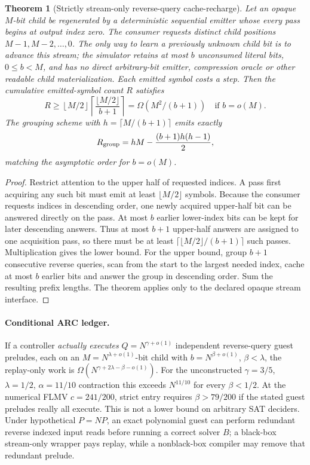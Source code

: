 \documentclass[10pt]{article}
\newtheorem{theorem}{Theorem}
\begin{document}
\begin{theorem}[Strictly stream-only reverse-query cache-recharge]
Let an opaque $M$-bit child be regenerated by a deterministic sequential
emitter whose every pass begins at output index zero.
The consumer requests distinct child positions $M-1,M-2,\ldots,0$.
The only way to learn a previously unknown child bit is to advance this
stream; the simulator retains at most $b$ unconsumed literal bits,
$0\le b<M$, and has no direct arbitrary-bit emitter, compression oracle
or other readable child materialization. Each emitted symbol costs a step.
Then the cumulative emitted-symbol count $R$ satisfies
\[
R\ge
\left\lfloor M/2\right\rfloor
\left\lceil\frac{\lfloor M/2\rfloor}{b+1}\right\rceil
=\Omega(M^2/(b+1))\quad\text{if }b=o(M).
\]
The grouping scheme with $h=\lceil M/(b+1)\rceil$ emits exactly
\[
R_{\rm group}
=hM-\frac{(b+1)h(h-1)}2,
\]
matching the asymptotic order for $b=o(M)$.
\end{theorem}
\begin{proof}
Restrict attention to the upper half of requested indices.
A pass first acquiring any such bit must emit at least
$\lfloor M/2\rfloor$ symbols. Because the consumer requests
indices in descending order, one newly acquired upper-half bit
can be answered directly on the pass. At most $b$ earlier
lower-index bits can be kept for later descending answers.
Thus at most $b+1$ upper-half answers are assigned to one
acquisition pass, so there must be at least
$\lceil\lfloor M/2\rfloor/(b+1)\rceil$ such passes.
Multiplication gives the lower bound. For the upper bound, group
$b+1$ consecutive reverse queries, scan from the start to the
largest needed index, cache at most $b$ earlier bits and answer
the group in descending order. Sum the resulting prefix lengths.
The theorem applies only to the declared opaque stream interface.
\end{proof}

\paragraph{Conditional ARC ledger.}
If a controller \emph{actually executes} $Q=N^{\gamma+o(1)}$
independent reverse-query guest preludes, each on an
$M=N^{\lambda+o(1)}$-bit child with
$b=N^{\beta+o(1)}$, $\beta<\lambda$, the replay-only work is
$\Omega(N^{\gamma+2\lambda-\beta-o(1)})$.
For the unconstructed $\gamma=3/5$, $\lambda=1/2$,
$\alpha=11/10$ contraction this exceeds $N^{11/10}$
for every $\beta<1/2$. At the numerical FLMV
$c=241/200$, strict entry requires $\beta>79/200$
if the stated guest preludes really all execute.
This is not a lower bound on arbitrary SAT deciders.
Under hypothetical $P=NP$, an exact polynomial guest can perform
redundant reverse indexed input reads before running a correct
solver $B$; a black-box stream-only wrapper pays replay, while a
nonblack-box compiler may remove that redundant prelude.
\end{document}
